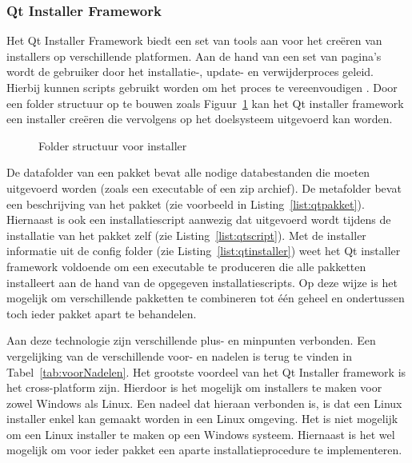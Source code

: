 \subsubsection{Qt Installer Framework}
Het Qt Installer Framework biedt een set van tools aan voor het creëren van installers op verschillende platformen.
Aan de hand van een set van pagina's wordt de gebruiker door het installatie-, update- en verwijderproces geleid.
Hierbij kunnen scripts gebruikt worden om het proces te vereenvoudigen \citep{qtDoc}.
Door een folder structuur op te bouwen zoals Figuur~\ref{fig:folder} kan het Qt installer framework een installer creëren die vervolgens op het doelsysteem uitgevoerd kan worden.

\begin{figure}[!ht]
\centering
{}
\caption{Folder structuur voor installer}
\label{fig:folder}
\end{figure}

De datafolder van een pakket bevat alle nodige databestanden die moeten uitgevoerd worden (zoals een executable of een zip archief).
De metafolder bevat een beschrijving van het pakket (zie voorbeeld in Listing~\ref{list:qtpakket}).
Hiernaast is ook een installatiescript aanwezig dat uitgevoerd wordt tijdens de installatie van het pakket zelf (zie Listing~\ref{list:qtscript}).
Met de installer informatie uit de config folder (zie Listing~\ref{list:qtinstaller}) weet het Qt installer framework voldoende om een executable te produceren die alle pakketten installeert aan de hand van de opgegeven installatiescripts.
Op deze wijze is het mogelijk om verschillende pakketten te combineren tot één geheel en ondertussen toch ieder pakket apart te behandelen.

Aan deze technologie zijn verschillende plus- en minpunten verbonden.
Een vergelijking van de verschillende voor- en nadelen is terug te vinden in Tabel~\ref{tab:voorNadelen}.
Het grootste voordeel van het Qt Installer framework is het cross-platform zijn.
Hierdoor is het mogelijk om installers te maken voor zowel Windows als Linux.
Een nadeel dat hieraan verbonden is, is dat een Linux installer enkel kan gemaakt worden in een Linux omgeving.
Het is niet mogelijk om een Linux installer te maken op een Windows systeem.
Hiernaast is het wel mogelijk om voor ieder pakket een aparte installatieprocedure te implementeren.


